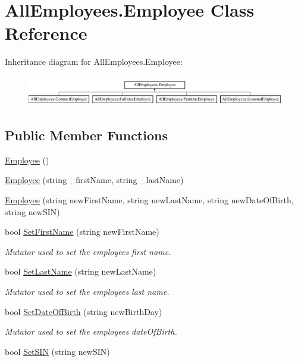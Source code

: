 \hypertarget{class_all_employees_1_1_employee}{}\section{All\+Employees.\+Employee Class Reference}
\label{class_all_employees_1_1_employee}
Inheritance diagram for All\+Employees.\+Employee\+:\begin{figure}[H]
\begin{center}
\leavevmode
\includegraphics[height=1.352657cm]{class_all_employees_1_1_employee}
\end{center}
\end{figure}
\subsection*{Public Member Functions}
\begin{DoxyCompactItemize}
\item 
\hyperlink{class_all_employees_1_1_employee_ac3aa5a59bf1ddba2c45cc933bf897e04}{Employee} ()
\item 
\hyperlink{class_all_employees_1_1_employee_a1dda639b37ae6932d08a0d9e872ad6d9}{Employee} (string \+\_\+first\+Name, string \+\_\+last\+Name)
\item 
\hyperlink{class_all_employees_1_1_employee_a575081acfa6ef5e529508f8c48413b96}{Employee} (string new\+First\+Name, string new\+Last\+Name, string new\+Date\+Of\+Birth, string new\+S\+I\+N)
\item 
bool \hyperlink{class_all_employees_1_1_employee_a436c523611e0be30ac560340df391e9b}{Set\+First\+Name} (string new\+First\+Name)
\begin{DoxyCompactList}\small\item\em Mutator used to set the employees first name. \end{DoxyCompactList}\item 
bool \hyperlink{class_all_employees_1_1_employee_aabf3b2d695f0a11e86a4489d9547a5ad}{Set\+Last\+Name} (string new\+Last\+Name)
\begin{DoxyCompactList}\small\item\em Mutator used to set the employees last name. \end{DoxyCompactList}\item 
bool \hyperlink{class_all_employees_1_1_employee_a2796c60c549d5c6699394e9f4242e074}{Set\+Date\+Of\+Birth} (string new\+Birth\+Day)
\begin{DoxyCompactList}\small\item\em Mutator used to set the employees date\+Of\+Birth. \end{DoxyCompactList}\item 
bool \hyperlink{class_all_employees_1_1_employee_acc5634d8c3f68f0ea3e70e6526e2cab9}{Set\+S\+I\+N} (string new\+S\+I\+N)
\end{DoxyCompactItemize}
